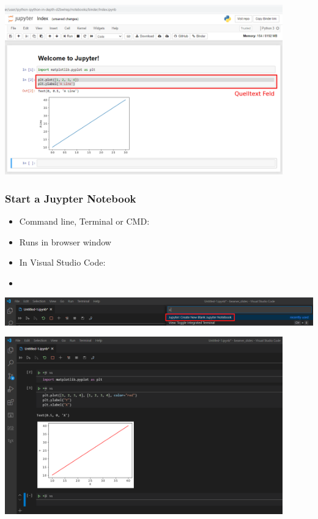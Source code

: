 \begin{frame}
    \begin{center}
      \includegraphics[width=0.9\textwidth]{screenshots/jupyter-1.png}
    \end{center}		
\end{frame}

\begin{frame}
	\frametitle{Start a Juypter Notebook}
    \begin{itemize}
      \item Command line, Terminal or CMD: 
      \item Runs in browser window
			\item In Visual Studio Code: 
			\item {} 			
    \end{itemize}
    \begin{center}
      \includegraphics[width=1.0\textwidth]{screenshots/vsc-2.png}
    \end{center}				
\end{frame}

\begin{frame}
    \begin{center}
      \includegraphics[width=0.9\textwidth]{screenshots/vsc-1.png}
    \end{center}				
\end{frame}

